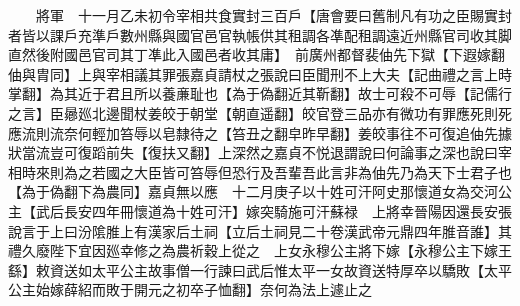 　　將軍　十一月乙未初令宰相共食實封三百戶【唐會要曰舊制凡有功之臣賜實封者皆以課戶充準戶數州縣與國官邑官執帳供其租調各凖配租調遠近州縣官司收其脚直然後附國邑官司其丁凖此入國邑者收其庸】　前廣州都督裴伷先下獄【下遐嫁翻伷與胄同】上與宰相議其罪張嘉貞請杖之張說曰臣聞刑不上大夫【記曲禮之言上時掌翻】為其近于君且所以養亷耻也【為于偽翻近其靳翻】故士可殺不可辱【記儒行之言】臣曏廵北邊聞杖姜皎于朝堂【朝直遥翻】皎官登三品亦有微功有罪應死則死應流則流奈何輕加笞辱以皂隸待之【笞丑之翻皁昨早翻】姜皎事往不可復追伷先據狀當流豈可復蹈前失【復扶又翻】上深然之嘉貞不悦退謂說曰何論事之深也說曰宰相時來則為之若國之大臣皆可笞辱但恐行及吾輩吾此言非為伷先乃為天下士君子也【為于偽翻下為農同】嘉貞無以應　十二月庚子以十姓可汗阿史那懷道女為交河公主【武后長安四年冊懷道為十姓可汗】嫁突騎施可汗蘇禄　上將幸晉陽因還長安張說言于上曰汾隂脽上有漢家后土祠【立后土祠見二十卷漢武帝元鼎四年脽音誰】其禮久廢陛下宜因廵幸修之為農祈穀上從之　上女永穆公主將下嫁【永穆公主下嫁王繇】敕資送如太平公主故事僧一行諫曰武后惟太平一女故資送特厚卒以驕敗【太平公主始嫁薛紹而敗于開元之初卒子恤翻】奈何為法上遽止之

